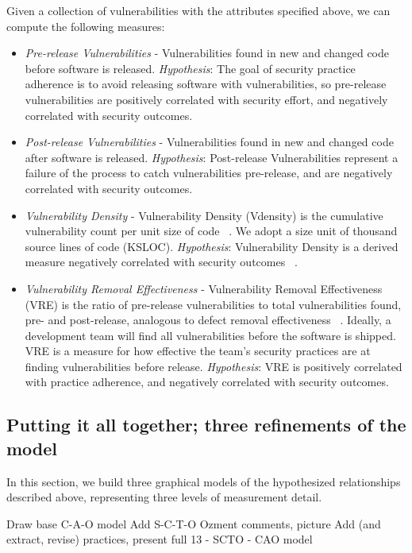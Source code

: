 Given a collection of vulnerabilities with the attributes specified above, we can compute the following measures:
\begin{itemize}
\item \textit{Pre-release Vulnerabilities} - Vulnerabilities found in new and changed code before software is released. \textit{Hypothesis}: The goal of security practice adherence is to avoid releasing software with vulnerabilities, so pre-release vulnerabilities are positively correlated with security effort, and negatively correlated with security outcomes.
\item \textit{Post-release Vulnerabilities} - Vulnerabilities found in new and changed code after software is released. \textit{Hypothesis}: Post-release Vulnerabilities represent a failure of the process to catch vulnerabilities pre-release, and are negatively correlated with security outcomes.
\item \textit{Vulnerability Density} - Vulnerability Density (Vdensity) is the cumulative vulnerability count per unit size of code ~\cite{alhazmi2007assessing}. We adopt a size unit of thousand source lines of code (KSLOC). \textit{Hypothesis}: Vulnerability Density is a derived measure negatively correlated with security outcomes ~\cite{alhazmi2007measuring}.
\item \textit{Vulnerability Removal Effectiveness} - Vulnerability Removal Effectiveness (VRE) is the ratio of pre-release vulnerabilities to total vulnerabilities found, pre- and post-release, analogous to defect removal effectiveness ~\cite{kan2002metrics}. Ideally, a development team will find all vulnerabilities before the software is shipped.  VRE is a measure for how effective the team’s security practices are at finding vulnerabilities before release. \textit{Hypothesis}: VRE is positively correlated with practice adherence, and negatively correlated with security outcomes.
\end{itemize}


\subsection{Putting it all together; three refinements of the model}

In this section, we build three graphical models of the hypothesized relationships described above, representing three levels of measurement detail.

	Draw base C-A-O model
	Add S-C-T-O Ozment comments, picture
	Add (and extract, revise) practices, present full 13 - SCTO - CAO model
	

